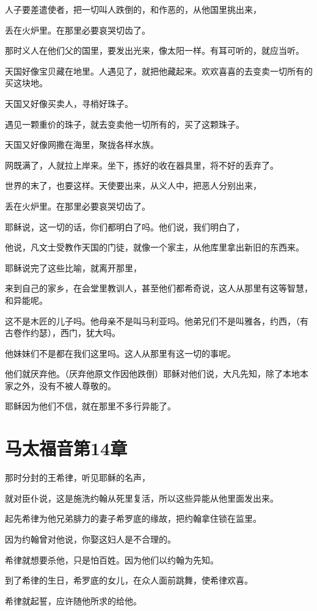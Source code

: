 \documentclass[12pt,oneside]{book}
\begin{document}
人子要差遣使者，把一切叫人跌倒的，和作恶的，从他国里挑出来，

丢在火炉里。在那里必要哀哭切齿了。

那时义人在他们父的国里，要发出光来，像太阳一样。有耳可听的，就应当听。

天国好像宝贝藏在地里。人遇见了，就把他藏起来。欢欢喜喜的去变卖一切所有的买这块地。

天国又好像买卖人，寻梢好珠子。

遇见一颗重价的珠子，就去变卖他一切所有的，买了这颗珠子。

天国又好像网撒在海里，聚拢各样水族。

网既满了，人就拉上岸来。坐下，拣好的收在器具里，将不好的丢弃了。

世界的末了，也要这样。天使要出来，从义人中，把恶人分别出来，

丢在火炉里。在那里必要哀哭切齿了。

耶稣说，这一切的话，你们都明白了吗。他们说，我们明白了，

他说，凡文士受教作天国的门徒，就像一个家主，从他库里拿出新旧的东西来。

耶稣说完了这些比喻，就离开那里，

来到自己的家乡，在会堂里教训人，甚至他们都希奇说，这人从那里有这等智慧，和异能呢。

这不是木匠的儿子吗。他母亲不是叫马利亚吗。他弟兄们不是叫雅各，约西，（有古卷作约瑟），西门，犹大吗。

他妹妹们不是都在我们这里吗。这人从那里有这一切的事呢。

他们就厌弃他。（厌弃他原文作因他跌倒）耶稣对他们说，大凡先知，除了本地本家之外，没有不被人尊敬的。

耶稣因为他们不信，就在那里不多行异能了。

\chapter{马太福音第14章}
那时分封的王希律，听见耶稣的名声，

就对臣仆说，这是施洗约翰从死里复活，所以这些异能从他里面发出来。

起先希律为他兄弟腓力的妻子希罗底的缘故，把约翰拿住锁在监里。

因为约翰曾对他说，你娶这妇人是不合理的。

希律就想要杀他，只是怕百姓。因为他们以约翰为先知。

到了希律的生日，希罗底的女儿，在众人面前跳舞，使希律欢喜。

希律就起誓，应许随他所求的给他。
\end{document}
